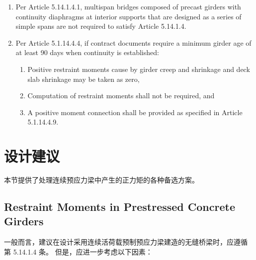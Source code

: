 \begin{enumerate}
  \item Per Article 5.14.1.4.1, multispan bridges composed of precast girders with continuity diaphragms at interior supports that are designed as a series of simple spans are not required to satisfy Article 5.14.1.4.
  \item Per Article 5.1.14.4.4, if contract documents require a minimum girder age of at least 90 days when continuity is established:
  \begin{enumerate}
    \item Positive restraint moments cause by girder creep and shrinkage and deck slab shrinkage may be taken as zero,
    \item Computation of restraint moments shall not be required, and
    \item A positive moment connection shall be provided as specified in Article 5.1.14.4.9.
  \end{enumerate}
\end{enumerate}

\section{设计建议}
本节提供了处理连续预应力梁中产生的正力矩的各种备选方案。

\subsection{Restraint Moments in Prestressed Concrete Girders}
一般而言，建议在设计采用连续活荷载预制预应力梁建造的无缝桥梁时，应遵循 \lrfd 第 5.14.1.4 条。 但是，应进一步考虑以下因素：
